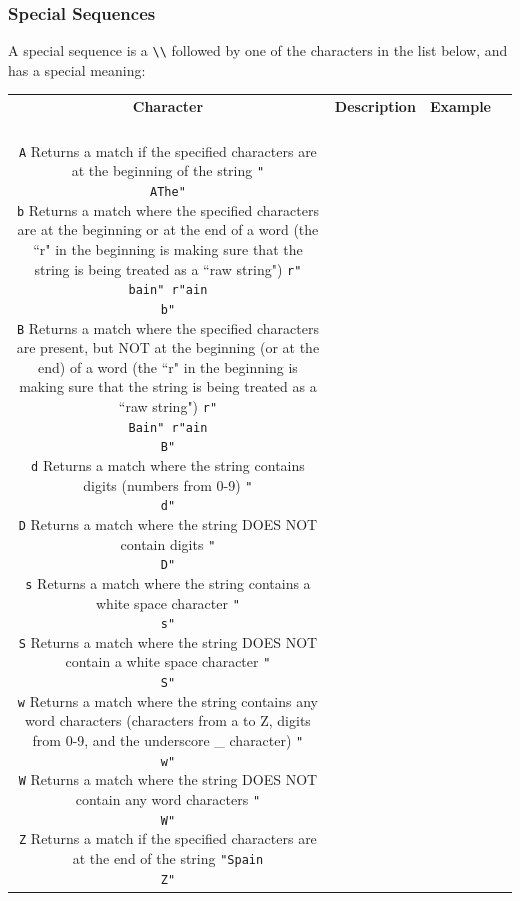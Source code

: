 \documentclass[12pt,a4paper]{article}
\newcommand{\code}[1]{%
	\colorbox{backcolour}{\lstinline{#1}}%
}
\newcommand{\lcode}[1]{%
	\lstinline{#1}%
}
\newcommand{\trcol}[3]{%
	#1 \quad  & #2 & #3 \\
}
\begin{document}
\subsubsection{Special Sequences}

A special sequence is a \code{\\} followed by one of the characters in the list
below, and has a special meaning:

\begin{table}[h]
	\begin{center}
		\begin{tabularx}{\textwidth}{cXlc}
\trcol{\textbf{Character}}{\textbf{Description}}{\textbf{Example}}
\trcol{\lcode{\\A}}
	{Returns a match if the specified characters are at the beginning of the string}
	{\lcode{"\\AThe"}}
\trcol{\lcode{\\b}}
	{Returns a match where the specified characters are at the beginning or at
	the end of a word (the ``r" in the beginning is making sure that the string
	is being treated as a ``raw string")}
	{\lcode{r"\\bain" r"ain\\b"}}
\trcol{\lcode{\\B}}
	{Returns a match where the specified characters are present, but NOT at the
	beginning (or at the end) of a word (the ``r" in the beginning is making
	sure that the string is being treated as a ``raw string")}
	{\lcode{r"\\Bain" r"ain\\B"}}
\trcol{\lcode{\\d}}
	{Returns a match where the string contains digits (numbers from 0-9)}
	{\lcode{"\\d"}}
\trcol{\lcode{\\D}}
	{Returns a match where the string DOES NOT contain digits}
	{\lcode{"\\D"}}
\trcol{\lcode{\\s}}
	{Returns a match where the string contains a white space character}
	{\lcode{"\\s"}}
\trcol{\lcode{\\S}}
	{Returns a match where the string DOES NOT contain a white space character}
	{\lcode{"\\S"}}
\trcol{\lcode{\\w}}
	{Returns a match where the string contains any word characters (characters
	from a to Z, digits from 0-9, and the underscore \_ character)}
	{\lcode{"\\w"}}
\trcol{\lcode{\\W}}
	{Returns a match where the string DOES NOT contain any word characters}
	{\lcode{"\\W"}}
\trcol{\lcode{\\Z}}
	{Returns a match if the specified characters are at the end of the string}
	{\lcode{"Spain\\Z"}}
		\end{tabularx}
	\end{center}
\end{table}
\vfill\newpage
\end{document}
